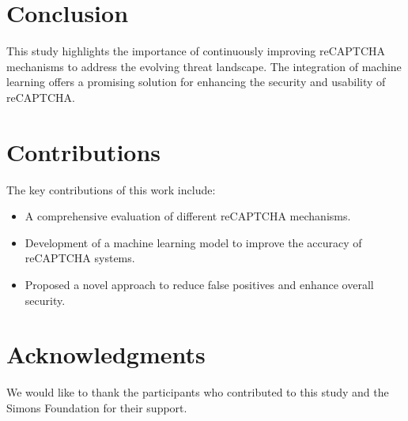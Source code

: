 \documentclass{article}
\begin{document}
\section{Conclusion}
This study highlights the importance of continuously improving reCAPTCHA mechanisms to address the evolving threat landscape. The integration of machine learning offers a promising solution for enhancing the security and usability of reCAPTCHA.

\section{Contributions}
The key contributions of this work include:
\begin{itemize}
    \item A comprehensive evaluation of different reCAPTCHA mechanisms.
    \item Development of a machine learning model to improve the accuracy of reCAPTCHA systems.
    \item Proposed a novel approach to reduce false positives and enhance overall security.
\end{itemize}

\section*{Acknowledgments}
We would like to thank the participants who contributed to this study and the Simons Foundation for their support.



\end{document}
